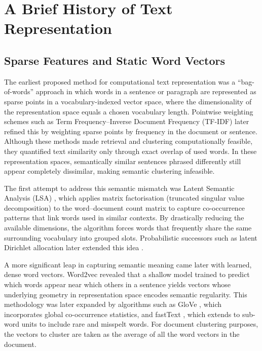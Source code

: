 \documentclass[11pt,a4paper,oneside]{report}
\begin{document}
\section{A Brief History of Text Representation}\label{sec:representation}

\subsection{Sparse Features and Static Word Vectors}

The earliest proposed method for computational text representation \citep{salton1975vector} was a ``bag-of-words'' approach in which words in a sentence or paragraph are represented as sparse points in a vocabulary-indexed vector space, where the dimensionality of the representation space equals a chosen vocabulary length. Pointwise weighting schemes such as Term Frequency--Inverse Document Frequency (TF-IDF) \citep{salton1988term} later refined this by weighting sparse points by frequency in the document or sentence. Although these methods made retrieval and clustering computationally feasible, they quantified text similarity only through exact overlap of used words. In these representation spaces, semantically similar sentences phrased differently still appear completely dissimilar, making semantic clustering infeasible.

The first attempt to address this semantic mismatch was Latent Semantic Analysis (LSA)  \citep{deerwester1990lsa}, which applies matrix factorisation (truncated singular value decomposition) to the word--document count matrix to capture co-occurrence patterns that link words used in similar contexts. By drastically reducing the available dimensions, the algorithm forces words that frequently share the same surrounding vocabulary into grouped slots. Probabilistic successors such as latent Dirichlet allocation later extended this idea \citep{blei2003lda}.

A more significant leap in capturing semantic meaning came later with learned, dense word vectors. Word2vec \citep{mikolov2013efficient,mikolov2013distributed} revealed that a shallow model trained to predict which words appear near which others in a sentence yields vectors whose underlying geometry in representation space encodes semantic regularity. This methodology was later expanded by algorithms such as GloVe \citep{pennington2014glove}, which incorporates global co-occurrence statistics, and fastText \citep{bojanowski2017fasttext}, which extends to sub-word units to include rare and misspelt words. For document clustering purposes, the vectors to cluster are taken as the average of all the word vectors in the document.
\end{document}
